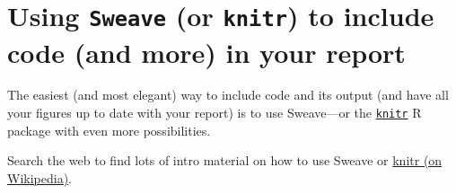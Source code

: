 \section{Using \texttt{Sweave} (or \texttt{knitr}) to include \Rp code (and more) in your report}
The easiest (and most elegant) way to include \Rp code and its output (and
have all your figures up to date with your report) is to use Sweave---or the
\href{https://cran.R-project.org/package=knitr}{\texttt{knitr}} R package with even more possibilities.

Search the web to find lots of intro material on how to use Sweave or
\href{https://en.wikipedia.org/wiki/Knitr}{knitr (on Wikipedia)}.


